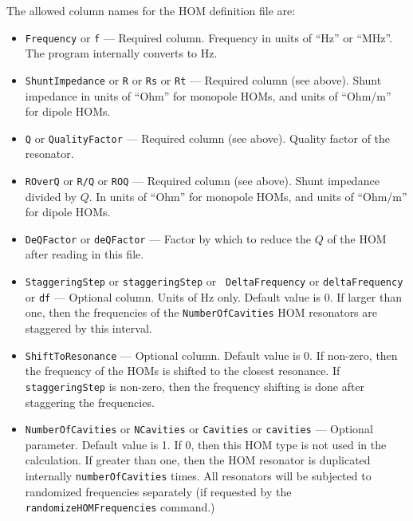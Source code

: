 \documentclass[11pt]{article}
\begin{document}
The allowed column names for the HOM definition file are: 
\begin{itemize}
\item{\tt Frequency} or {\tt f} --- Required column. Frequency in
    units of ``Hz'' or ``MHz''. The program internally converts to Hz.
\item{\tt ShuntImpedance} or {\tt R} or {\tt Rs} or {\tt Rt} ---
    Required column (see above).  Shunt impedance in units of ``Ohm'' for
    monopole HOMs, and units of ``Ohm/m'' for dipole HOMs.
\item{\tt Q} or {\tt QualityFactor} --- Required column (see above). Quality factor of the resonator.
\item{\tt ROverQ} or {\tt R/Q} or {\tt ROQ} --- Required column (see
    above). Shunt impedance divided by $Q$. In units of ``Ohm'' for
    monopole HOMs, and units of ``Ohm/m'' for dipole HOMs.
\item{\tt DeQFactor} or {\tt deQFactor} --- Factor by which to reduce the
  $Q$ of the HOM after reading in this file.
\item{\tt StaggeringStep} or {\tt staggeringStep} or {\tt
DeltaFrequency} or {\tt deltaFrequency} or {\tt df} --- Optional
column. Units of Hz only. Default value is 0. If larger than one, then the
frequencies of the {\tt NumberOfCavities} HOM resonators are staggered
by this interval.
\item{\tt ShiftToResonance} --- Optional column. Default value is
0. If non-zero, then the frequency of the HOMs is shifted to the
closest resonance. If {\tt staggeringStep} is non-zero, then the
frequency shifting is done after staggering the frequencies.

\item{\tt NumberOfCavities} or {\tt NCavities} or {\tt Cavities} or
  {\tt cavities} --- Optional parameter. Default value is 1. If 0,
  then this HOM type is not used in the calculation.   If greater than one,
then the HOM resonator is duplicated internally {\tt numberOfCavities}
times. 
All resonators will be subjected to randomized frequencies separately (if
requested by the {\tt randomizeHOMFrequencies} command.) 
\end{itemize}
\end{document}
